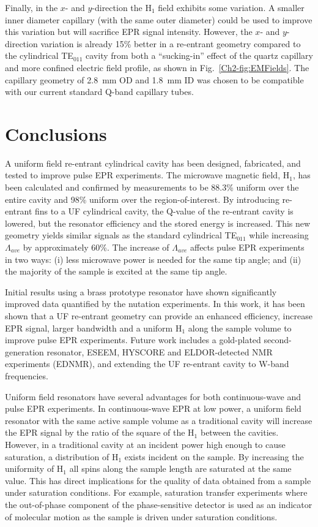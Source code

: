 Finally, in the $x$- and $y$-direction the H$_1$ field exhibits some variation. A smaller inner diameter capillary (with the same outer diameter) could be used to improve this variation but will sacrifice EPR signal intensity. However, the $x$- and $y$-direction variation is already 15\% better in a re-entrant geometry compared to the cylindrical TE$_{011}$ cavity from both a ``sucking-in'' effect of the quartz capillary and more confined electric field profile, as shown in Fig.~\ref{Ch2-fig:EMFields}. The capillary geometry of 2.8~mm OD and 1.8~mm ID was chosen to be compatible with our current standard Q-band capillary tubes. 

\section{Conclusions}
A uniform field re-entrant cylindrical \cylTE{} cavity has been designed, fabricated, and tested to improve pulse EPR experiments. The microwave magnetic field, H$_1$, has been calculated and confirmed by measurements to be 88.3\% uniform over the entire cavity and 98\% uniform over the region-of-interest. By introducing re-entrant fins to a UF cylindrical \cylTE{} cavity, the Q-value of the re-entrant \cylTE{} cavity is lowered, but the resonator efficiency and the stored energy is increased. This new geometry yields similar signals as the standard cylindrical TE$_{011}$ while increasing $\Lambda_{ave}$ by approximately 60\%. The increase of $\Lambda_{ave}$ affects pulse EPR experiments in two ways: (i) less microwave power is needed for the same tip angle; and (ii) the majority of the sample is excited at the same tip angle. 

Initial results using a brass prototype resonator have shown significantly improved data quantified by the nutation experiments. In this work, it has been shown that a UF re-entrant geometry can provide an enhanced efficiency, increase EPR signal, larger bandwidth and a uniform H$_1$ along the sample volume to improve pulse EPR experiments. Future work includes a gold-plated second-generation resonator, ESEEM, HYSCORE and ELDOR-detected NMR experiments (EDNMR), and extending the UF re-entrant \cylTE{} cavity to W-band frequencies.

Uniform field resonators have several advantages for both continuous-wave and pulse EPR experiments. In continuous-wave EPR at low power, a uniform field resonator with the same active sample volume as a traditional cavity will increase the EPR signal by the ratio of the square of the H$_1$ between the cavities. However, in a traditional cavity at an incident power high enough to cause saturation, a distribution of H$_1$ exists incident on the sample. By increasing the uniformity of H$_1$ all spins along the sample length are saturated at the same value. This has direct implications for the quality of data obtained from a sample under saturation conditions. For example, saturation transfer experiments where the out-of-phase component of the phase-sensitive detector is used as an indicator of molecular motion as the sample is driven under saturation conditions. \cite{SaturationTransfer2005} 

